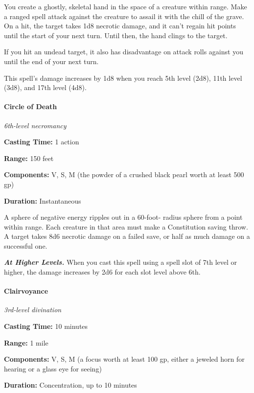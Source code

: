 \documentclass[
]{article}
\begin{document}
You create a ghostly, skeletal hand in the space of a creature within
range. Make a ranged spell attack against the creature to assail it with
the chill of the grave. On a hit, the target takes 1d8 necrotic damage,
and it can't regain hit points until the start of your next turn. Until
then, the hand clings to the target.

If you hit an undead target, it also has disadvantage on attack rolls
against you until the end of your next turn.

This spell's damage increases by 1d8 when you reach 5th level (2d8),
11th level (3d8), and 17th level (4d8).

\hypertarget{circle-of-death}{%
\paragraph{Circle of Death}\label{circle-of-death}}

\emph{6th-level necromancy}

\textbf{Casting Time:} 1 action

\textbf{Range:} 150 feet

\textbf{Components:} V, S, M (the powder of a crushed black pearl worth
at least 500 gp)

\textbf{Duration:} Instantaneous

A sphere of negative energy ripples out in a 60-foot- radius sphere from
a point within range. Each creature in that area must make a
Constitution saving throw. A target takes 8d6 necrotic damage on a
failed save, or half as much damage on a successful one.

\emph{\textbf{At Higher Levels.}} When you cast this spell using a spell
slot of 7th level or higher, the damage increases by 2d6 for each slot
level above 6th.

\hypertarget{clairvoyance}{%
\paragraph{Clairvoyance}\label{clairvoyance}}

\emph{3rd-level divination}

\textbf{Casting Time:} 10 minutes

\textbf{Range:} 1 mile

\textbf{Components:} V, S, M (a focus worth at least 100 gp, either a
jeweled horn for hearing or a glass eye for seeing)

\textbf{Duration:} Concentration, up to 10 minutes
\end{document}
